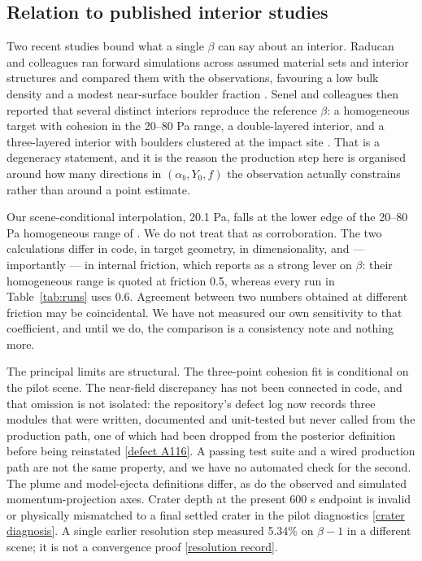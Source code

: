 \documentclass[10pt,twocolumn]{article}
\newcommand{\Yzero}{Y_0}
\newcommand{\aB}{\alpha_b}
\newcommand{\repo}[2]{\href{https://github.com/Yagiz-D-Ekrem-Dolar/dart-rift/blob/a35dab4/#1}{#2}}
\begin{document}
\subsection*{Relation to published interior studies}
Two recent studies bound what a single $\beta$ can say about an
interior. Raducan and colleagues ran forward simulations across assumed
material sets and interior structures and compared them with the
observations, favouring a low bulk density and a modest near-surface
boulder fraction \cite{raducan2024}. Senel and colleagues then reported
that several distinct interiors reproduce the reference $\beta$: a
homogeneous target with cohesion in the 20--80 Pa range, a
double-layered interior, and a three-layered interior with boulders
clustered at the impact site \cite{senel2025}. That is a degeneracy
statement, and it is the reason the production step here is organised
around how many directions in $(\aB,\Yzero,f)$ the observation actually
constrains rather than around a point estimate.

Our scene-conditional interpolation, 20.1 Pa, falls at the lower edge
of the 20--80 Pa homogeneous range of \cite{senel2025}. We do not treat
that as corroboration. The two calculations differ in code, in target
geometry, in dimensionality, and --- importantly --- in internal
friction, which \cite{senel2025} reports as a strong lever on $\beta$:
their homogeneous range is quoted at friction 0.5, whereas every run in
Table~\ref{tab:runs} uses 0.6. Agreement between two numbers obtained at
different friction may be coincidental. We have not measured our own
sensitivity to that coefficient, and until we do, the comparison is a
consistency note and nothing more.

The principal limits are structural. The three-point
cohesion fit is conditional on the pilot scene. The
near-field discrepancy has not been connected in code,
and that omission is not isolated: the repository's defect
log now records three modules that were written, documented
and unit-tested but never called from the production path,
one of which had been dropped from the posterior definition
before being reinstated
\repo{docs/FAZ4-SIKINTI-RAPORU.md}{[defect A116]}.
A passing test suite and a wired production path are not
the same property, and we have no automated check for the
second.
The plume and model-ejecta definitions differ, as do
the observed and simulated momentum-projection axes.
Crater depth at the present 600 s endpoint is invalid or
physically mismatched to a final settled crater in the
pilot diagnostics
\repo{docs/defter/KAYIT-076_2026-10-06_DO-DC-DN-uc-kilitli-yargi.md}{[crater diagnosis]}.
A single earlier resolution step measured 5.34\%
on $\beta-1$ in a different scene; it is not a convergence
proof \repo{docs/defter/KAYIT-071_2026-09-29_UY2-azaliyor-DY-okunmaz-A112.md}{[resolution record]}.
\end{document}
